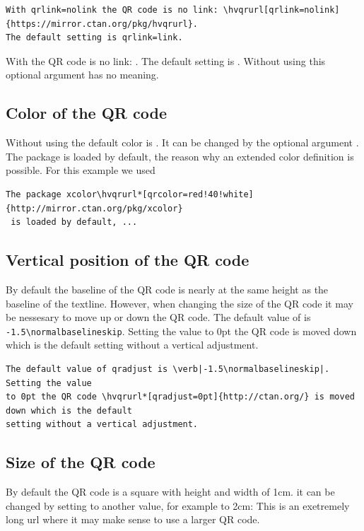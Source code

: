 \documentclass[twoside,usegeometry]{scrartcl}
\begin{document}
\begin{lstlisting}
With qrlink=nolink the QR code is no link: \hvqrurl[qrlink=nolink]{https://mirror.ctan.org/pkg/hvqrurl}.
The default setting is qrlink=link.
\end{lstlisting}
With  the QR code is no link: .
The default setting is . Without using  this optional argument
has no meaning.

\subsection{Color of the QR code}
Without using  the default color is . It can be changed by
the optional argument . The package 
 is loaded by default, 
the reason why an extended color definition is possible. For this example we used

\begin{lstlisting}
The package xcolor\hvqrurl*[qrcolor=red!40!white]{http://mirror.ctan.org/pkg/xcolor}
 is loaded by default, ...
\end{lstlisting}

\subsection{Vertical position of the QR code}
By default the baseline of the QR code is nearly at the same height as the baseline of the textline.
However, when changing the size of the QR code it may be nessesary to move up or down the QR code.
The default value of  is \verb|-1.5\normalbaselineskip|. Setting the value
to 0pt the QR code  is moved down which is the default
setting without a vertical adjustment.

\begin{lstlisting}
The default value of qradjust is \verb|-1.5\normalbaselineskip|. Setting the value
to 0pt the QR code \hvqrurl*[qradjust=0pt]{http://ctan.org/} is moved down which is the default
setting without a vertical adjustment.
\end{lstlisting}


\subsection{Size of the QR code}
By default the QR code is a square with height and width of 1cm.
it can be changed by setting  to another value, for example to 2cm:
This is an exetremely long url where it may make sense to use a larger QR code.
\end{document}
